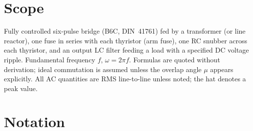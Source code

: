 \documentclass[10pt,a4paper]{scrartcl}
\begin{document}

\tableofcontents
\newpage

\section*{Scope}
Fully controlled six-pulse bridge (B6C, DIN~41761) fed by a transformer (or line reactor), one fuse in series with each thyristor (arm fuse), one RC snubber across each thyristor, and an output LC filter feeding a load with a specified DC voltage ripple. Fundamental frequency $f$, $\omega = 2\pi f$. Formulas are quoted without derivation; ideal commutation is assumed unless the overlap angle $\mu$ appears explicitly. All AC quantities are RMS line-to-line unless noted; the hat denotes a peak value.

\section*{Notation}
\end{document}
